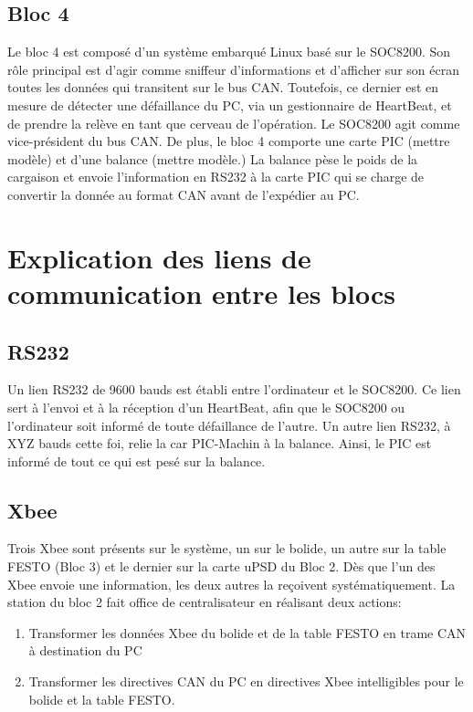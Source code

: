 \documentclass[10pt,a4paper,final]{article}
\begin{document}
\begin{spacing}{1.5}
\subsection{Bloc 4}
Le bloc 4 est composé d'un système embarqué Linux basé sur le SOC8200. Son rôle principal est d'agir comme sniffeur d'informations et d'afficher sur son écran toutes les données qui transitent sur le bus CAN. Toutefois, ce dernier est en mesure de détecter une défaillance du PC, via un gestionnaire de HeartBeat, et de prendre la relève en tant que cerveau de l'opération. Le SOC8200 agit comme vice-président du bus CAN. De plus, le bloc 4 comporte une carte PIC (mettre modèle) et d'une balance (mettre modèle.) La balance pèse le poids de la cargaison et envoie l'information en RS232 à la carte PIC qui se charge de convertir la donnée au format CAN avant de l'expédier au PC.

\vfill
\pagebreak
\section{Explication des liens de communication entre les blocs}

\subsection{RS232}
Un lien RS232 de 9600 bauds est établi entre l'ordinateur et le SOC8200. Ce lien sert à l'envoi et à la réception d'un HeartBeat, afin que le SOC8200 ou l'ordinateur soit informé de toute défaillance de l'autre. Un autre lien RS232, à XYZ bauds cette foi, relie la car PIC-Machin à la balance. Ainsi, le PIC est informé de tout ce qui est pesé sur la balance.

\subsection{Xbee}
Trois Xbee sont présents sur le système, un sur le bolide, un autre sur la table FESTO (Bloc 3) et le dernier sur la carte uPSD du Bloc 2. Dès que l'un des Xbee envoie une information, les deux autres la reçoivent systématiquement.  La station du bloc 2 fait office de centralisateur en réalisant deux actions:
\begin{enumerate}
\item[1.]Transformer les données Xbee du bolide et de la table FESTO en trame CAN à destination du PC
\item[2.]Transformer les directives CAN du PC en directives Xbee intelligibles pour le bolide et la table FESTO.
\end{enumerate}


\end{spacing}
\end{document}

